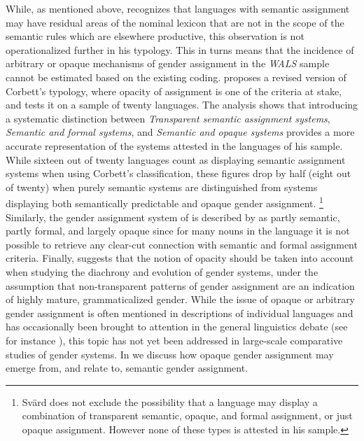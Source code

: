 \documentclass[output=collectionpaper]{langsci/langscibook}
\begin{document}
While, as mentioned above, \cite{Corbett2013b} recognizes that languages with semantic assignment may have residual areas of the nominal lexicon that are not in the scope of the semantic rules which are elsewhere productive, this observation is not operationalized further in his typology. This in turns means that the incidence of arbitrary or opaque mechanisms of gender assignment in the \textit{WALS} sample cannot be estimated based on the existing coding.  proposes a revised version of Corbett's typology, where opacity of assignment is one of the criteria at stake, and tests it on a sample of twenty  languages. The analysis shows that introducing a systematic distinction between \emph{Transparent semantic assignment systems}, \emph{Semantic and formal systems}, and \emph{Semantic and opaque systems} provides a more accurate representation of the systems attested in the languages of his sample. While sixteen out of twenty languages count as displaying semantic assignment systems when using Corbett's classification, these figures drop by half (eight out of twenty) when purely semantic systems are distinguished from systems displaying both semantically predictable and opaque gender assignment.%
\footnote{
Svärd does not exclude the possibility that a language may display a combination of transparent semantic, opaque, and formal assignment, or just opaque assignment. However none of these types is attested in his sample.
} %
Similarly, the gender assignment system of  is described by  as partly semantic, partly formal, and largely opaque since for many nouns in the language it is not possible to retrieve any clear-cut connection with semantic and formal assignment criteria. Finally,  suggests that the notion of opacity should be taken into account when studying the diachrony and evolution of gender systems, under the assumption that non-transparent patterns of gender assignment are an indication of highly mature, grammaticalized gender. While the issue of opaque or arbitrary gender assignment is often mentioned in descriptions of individual languages and has occasionally been brought to attention in the general linguistics debate (see for instance \citealt{Dahl2000a}), this topic has not yet been addressed in large-scale comparative studies of gender systems. In  we discuss how opaque gender assignment may emerge from, and relate to, semantic gender assignment.
\end{document}
